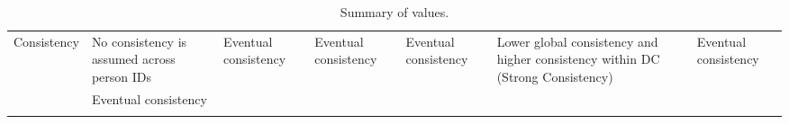 \begin{landscape}
\begin{center}
\begin{longtable}{|p{2.2cm}||p{3.6cm}|p{3.4cm}|p{3.4cm}||p{3.8cm}|p{3.4cm}|p{3.1cm}|}
			Consistency & 
				No consistency is assumed across person IDs & 
				Eventual consistency & 
				Eventual consistency & 
				Eventual consistency & 
				\multirow{2}{3.6cm}{Lower global consistency and higher consistency within DC (Strong Consistency)} & 
				Eventual consistency \\ \cline{2-2}
	
				 & 
				Eventual consistency & 
				 & 
				 & 
				 & 
				 & 
				  \\
			\hline
		
			\caption{Summary of values.}
			\label{tbl:metrics}
		\end{longtable}
	\end{center}
\end{landscape}